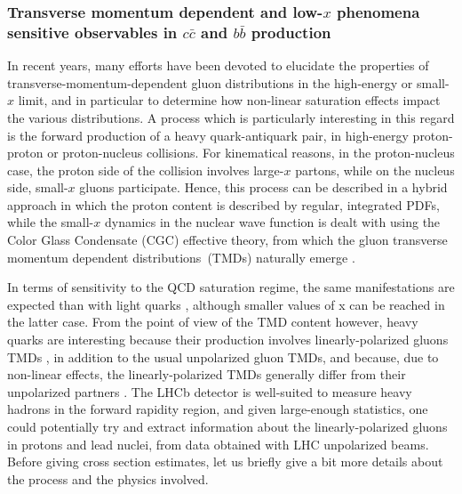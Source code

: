 \documentclass[../report.tex]{subfiles}
\begin{document}
\subsubsection{Transverse momentum dependent and low-$x$ phenomena sensitive observables in $c\bar{c}$ and $b\bar{b}$ production }
\label{sec:cgctmd}

In recent years, many efforts have been devoted to elucidate the properties of transverse-momentum-dependent gluon distributions in the high-energy or small-$x$ limit, and in particular to determine how non-linear saturation effects impact the various distributions. A process which is particularly interesting in this regard is the forward production of a heavy quark-antiquark pair, in high-energy proton-proton or proton-nucleus collisions. For kinematical reasons, in the proton-nucleus case, the proton side of the collision involves large-$x$ partons, while on the nucleus side, small-$x$ gluons participate. Hence, this process can be described in a hybrid approach in which the proton content is described by regular, integrated PDFs, while the small-$x$ dynamics in the nuclear wave function is dealt with using the Color Glass Condensate (CGC) effective theory, from which the gluon transverse momentum dependent distributions~(TMDs)  naturally emerge \cite{Dominguez:2011wm,Marquet:2016cgx}.

In terms of sensitivity to the QCD saturation regime, the same manifestations are expected than with light quarks \cite{Albacete:2018ruq}, although smaller values of x can be reached in the latter case. From the point of view of the TMD content however, heavy quarks are interesting because their production involves linearly-polarized gluons TMDs \cite{Akcakaya:2012si}, in addition to the usual unpolarized gluon TMDs, and because, due to non-linear effects, the linearly-polarized TMDs generally differ from their unpolarized partners \cite{Marquet:2017xwy}. The LHCb detector is well-suited to measure heavy hadrons in the forward rapidity region, and given large-enough statistics, one could potentially try and extract information about the linearly-polarized gluons in protons and lead nuclei, from data obtained with LHC unpolarized beams. Before giving cross section estimates, let us briefly give a bit more details about the process and the physics involved.
\end{document}
